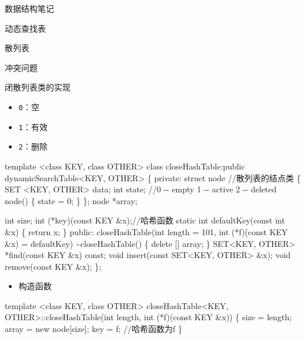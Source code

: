 \documentclass[
  ignorenonframetext,
]{beamer}
\newenvironment{Shaded}{}{}
\newcommand{\NormalTok}[1]{#1}
\providecommand{\tightlist}{%
  \setlength{\itemsep}{0pt}\setlength{\parskip}{0pt}}
\begin{document}
\begin{frame}[fragile]{数据结构笔记}
\begin{block}{动态查找表}
\begin{block}{散列表}
\begin{block}{冲突问题}
\begin{block}{闭散列表类的实现}
\begin{itemize}
  \begin{itemize}
  \tightlist
  \item
    \texttt{0}：空
  \item
    \texttt{1}：有效
  \item
    \texttt{2}：删除
  \end{itemize}
\end{itemize}

\begin{Shaded}
\begin{Highlighting}[]
\NormalTok{template \textless{}class KEY, class OTHER\textgreater{}}
\NormalTok{class closeHashTable:public dynamicSearchTable\textless{}KEY, OTHER\textgreater{}}
\NormalTok{\{}
\NormalTok{  private:}
\NormalTok{    struct node  //散列表的结点类}
\NormalTok{    \{ }
\NormalTok{      SET \textless{}KEY, OTHER\textgreater{} data;}
\NormalTok{      int state; //0 {-}{-} empty 1 {-}{-} active 2 {-}{-} deleted}
\NormalTok{      node()}
\NormalTok{      \{}
\NormalTok{        state = 0;}
\NormalTok{      \}}
\NormalTok{    \};}
\NormalTok{    node *array;}
  
\NormalTok{    int size;}
\NormalTok{    int (*key)(const KEY \&x);//哈希函数}
\NormalTok{    static int defaultKey(const int \&x)}
\NormalTok{    \{}
\NormalTok{      return x;}
\NormalTok{    \}}
\NormalTok{  public:}
\NormalTok{    closeHashTable(int length = 101, int (*f)(const KEY \&x) = defaultKey)}
\NormalTok{    \textasciitilde{}closeHashTable()}
\NormalTok{    \{}
\NormalTok{      delete [] array;}
\NormalTok{    \}}
\NormalTok{    SET\textless{}KEY, OTHER\textgreater{} *find(const KEY \&x) const;}
\NormalTok{    void insert(const SET\textless{}KEY, OTHER\textgreater{} \&x);}
\NormalTok{    void remove(const KEY \&x);}
\NormalTok{\};}
\end{Highlighting}
\end{Shaded}

\begin{itemize}
\tightlist
\item
  构造函数
\end{itemize}

\begin{Shaded}
\begin{Highlighting}[]
\NormalTok{template \textless{}class KEY, class OTHER\textgreater{}}
\NormalTok{closeHashTable\textless{}KEY, OTHER\textgreater{}::closeHashTable(int length, int (*f)(const KEY \&x))}
\NormalTok{\{}
\NormalTok{  size = length;}
\NormalTok{  array = new node[size];}
\NormalTok{  key = f; //哈希函数为f}
\NormalTok{\}}
\end{Highlighting}
\end{Shaded}


\end{block}
\end{block}
\end{block}
\end{block}
\end{frame}
\end{document}
